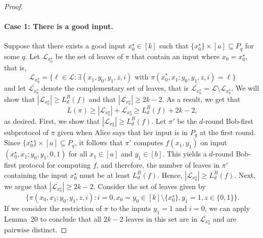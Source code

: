 \documentclass[10pt,a4paper]{article}
\begin{document}
\begin{proof}
\paragraph{Case 1: There is a good input.} Suppose that there exists a good input $x_0^\star\in[k]$ such that $\{x_0^\star\}\times[a]\subseteq P_q$ for some $q$. Let $\mathcal L_{x_0^\star}$ be the set of leaves of $\pi$ that contain an input where $x_0=x_0^\star$, that is,
\[\mathcal L_{x_0^\star}=\{\ell\in\mathcal L:\exists(x_1,y_0,y_1,z,i)\text{ with }\pi(x_0^*,x_1;y_0,y_1,z,i)=\ell\}\]
and let $\overline{\mathcal L_{x_0^\star}}$ denote the complementary set of leaves, that is $\overline{\mathcal L_{x_0^\star}}=\mathcal L\setminus\mathcal L_{x_0^\star}$. We will show that $|\mathcal L_{x_0^\star}|\ge L_d^B(f)$ and that $|\overline{\mathcal L_{x_0^\star}}|\ge2k-2$. As a result, we get that
\[L(\pi)\ge|\mathcal L_{x_0^\star}|+\overline{\mathcal L_{x_0^\star}}\ge L_d^B(f)+2k-2,\]
as desired.
First, we show that $|\mathcal L_{x_0^\star}|\ge L_d^B(f)$. Let $\pi'$ be the $d$-round Bob-first subprotocol of $\pi$ given when Alice says that her input is in $P_q$ at the first round. Since $\{x_0^\star\}\times[a]\subseteq P_q$, it follows that $\pi'$ computes $f(x_1,y_1)$ on input $(x_0^\star,x_1;y_0,y_1,0,1)$ for all $x_1\in[a]$ and $y_1\in[b]$. This yields a $d$-round Bob-first protocol for computing $f$, and therefore, the number of leaves in $\pi'$ containing the input $x_0^\star$ must be at least $L_d^B(f)$. Hence, $|\mathcal L_{x_0^\star}|\ge L_d^B(f)$.
Next, we argue that $|\overline{\mathcal L_{x_0^\star}}|\ge2k-2$. Consider the set of leaves given by
\[\{\pi(x_0,x_1;y_0,y_1,z,i):i=0,x_0=y_0\in[k]\setminus\{x_0^\star\},y_1=1,z\in\{0,1\}\}.\]
If we consider the restriction of $\pi$ to the inputs $y_1=1$ and $i=0$, we can apply Lemma~20 to conclude that all $2k-2$ leaves in this set are in $\overline{\mathcal L_{x_0^\star}}$ and are pairwise distinct.

\end{proof}
\end{document}
